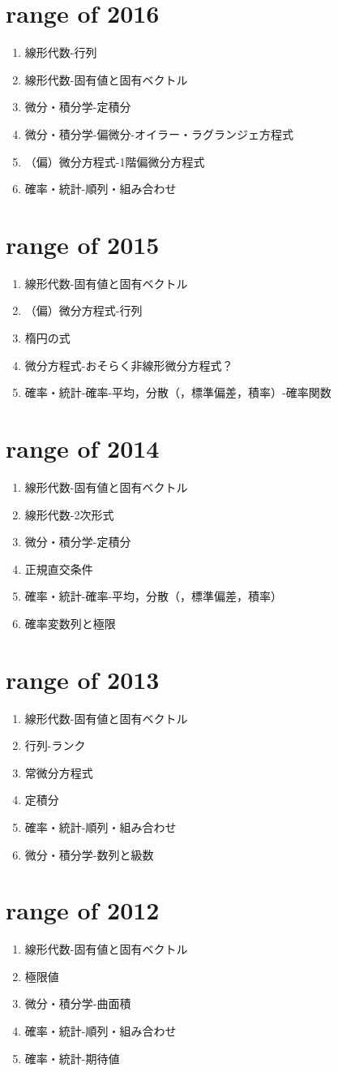 \documentclass[11pt,a4paper]{jsarticle}
\begin{document}
\section{range of 2016}
\begin{enumerate}
  \item 線形代数-行列
  \item 線形代数-固有値と固有ベクトル
  \item 微分・積分学-定積分
  \item 微分・積分学-偏微分-オイラー・ラグランジェ方程式
  \item （偏）微分方程式-1階偏微分方程式
  \item 確率・統計-順列・組み合わせ
\end{enumerate}

\section{range of 2015}
\begin{enumerate}
  \item 線形代数-固有値と固有ベクトル
  \item （偏）微分方程式-行列
  \item 楕円の式
  \item 微分方程式-おそらく非線形微分方程式？
  \item 確率・統計-確率-平均，分散（，標準偏差，積率）-確率関数
\end{enumerate}

\section{range of 2014}
\begin{enumerate}
  \item 線形代数-固有値と固有ベクトル
  \item 線形代数-2次形式
  \item 微分・積分学-定積分
  \item 正規直交条件
  \item 確率・統計-確率-平均，分散（，標準偏差，積率）
  \item 確率変数列と極限
\end{enumerate}

\section{range of 2013}
\begin{enumerate}
  \item 線形代数-固有値と固有ベクトル
  \item 行列-ランク
  \item 常微分方程式
  \item 定積分
  \item 確率・統計-順列・組み合わせ
  \item 微分・積分学-数列と級数
\end{enumerate}

\section{range of 2012}
\begin{enumerate}
  \item 線形代数-固有値と固有ベクトル
  \item 極限値
  \item 微分・積分学-曲面積
  \item 確率・統計-順列・組み合わせ
  \item 確率・統計-期待値
\end{enumerate}
\end{document}
